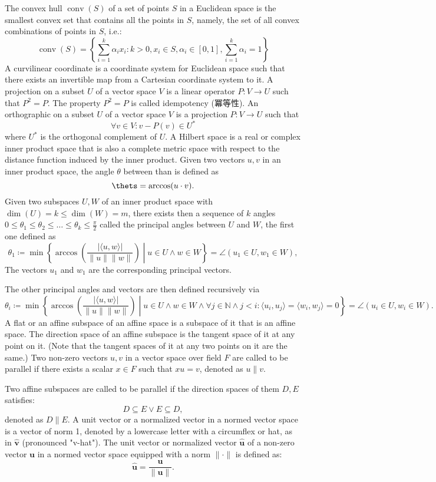 \documentclass[a4paper,12pt]{article}
\begin{document}
The convex hull $\operatorname{conv} (S)$ of a set of points $S$ in a Euclidean space is the smallest convex set that contains all the points in $S$, namely, the set of all convex combinations of points in $S$, i.e.:
\[\operatorname{conv}(S)=\left\{\sum _{i=1}^k\alpha _ix_i\colon k>0,x_i\in S,\alpha _i\in [0,1],\sum _{i=1}^k\alpha _i=1\right\}\]
A curvilinear coordinate is a coordinate system for Euclidean space such that there exists an invertible map from a Cartesian coordinate system to it.
A projection on a subset $U$ of a vector space $V$ is a linear operator $P\colon V\to U$ such that $P^2=P$. The property $P^2=P$ is called idempotency (冪等性).
An orthographic on a subset $U$ of a vector space $V$ is a projection $P\colon V\to U$  such that 
\[ \forall v\in V\colon v - P(v)\in U^*\]
where $U^*$ is the orthogonal complement of \( U \).
A Hilbert space is a real or complex inner product space that is also a complete metric space with respect to the distance function induced by the inner product.
Given two vectors $u,v$ in an inner product space, the angle $\theta$ between than is defined as
\[\thets=\arccos(u\cdot v).\]
Given two subspaces $U,W$ of an inner product space with $\dim(U)=k\leq\dim(W)=m$, there exists then a sequence of $k$ angles $0\leq\theta_1\leq\theta_2\leq\ldots\leq\theta_k\leq\frac{\pi}{2}$ called the principal angles between $U$ and $W$, the first one defined as
\[\theta_1\coloneq\min\left\{\arccos\left(\frac{|\langle u,w\rangle|}{\|u\|\|w\|}\right)\middle |u\in U\land w\in W\right\}=\angle(u_1\in U,w_1\in W),\]
The vectors $u_1$ and $w_1$ are the corresponding principal vectors.

The other principal angles and vectors are then defined recursively via
\[\theta_i\coloneq\min\left\{\arccos\left(\frac{|\langle u,w\rangle|}{\|u\|\|w\|}\right)\middle |u\in U\land w\in W\land \forall j\in\mathbb{N}\land j<i\colon\langle u_i,u_j\rangle=\langle w_i,w_j\rangle=0\right\}=\angle(u_i\in U,w_i\in W).\]
A flat or an affine subspace of an affine space is a subspace of it that is an affine space.
The direction space of an affine subspace is the tangent space of it at any point on it. (Note that the tangent spaces of it at any two points on it are the same.)
Two non-zero vectors $u,v$ in a vector space over field $F$ are called to be parallel if there exists a scalar $x\in F$ such that $xu=v$, denoted as $u\parallel v$.

Two affine subspaces are called to be parallel if the direction spaces of them $D,E$ satisfies:
\[D\subseteq E\lor E\subseteq D,\]
denoted as $D\parallel E$.
A unit vector or a normalized vector in a normed vector space is a vector of norm 1, denoted by a lowercase letter with a circumflex or hat, as in $\hat{\mathbf{v}}$ (pronounced "v-hat"). The unit vector or normalized vector $\hat{\mathbf{u}}$ of a non-zero vector $\mathbf{u}$ in a normed vector space equipped with a norm $\|\cdot\|$ is defined as:
\[\hat{\mathbf{u}}=\frac{\mathbf{u}}{\|\mathbf{u}\|}.\]
\end{document}
